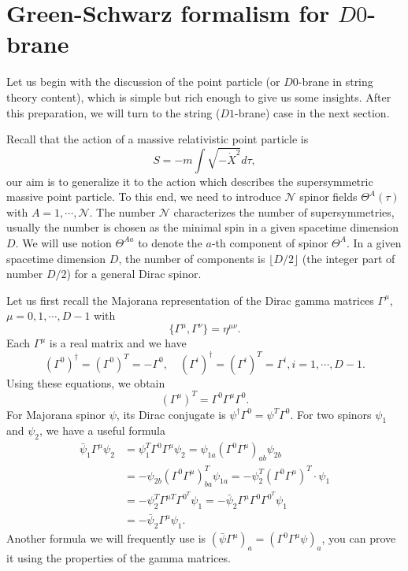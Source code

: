 \documentclass[graybox,envcountchap,sectrefs]{svmono}
\begin{document}
\section{Green-Schwarz formalism for $D0$-brane}
Let us begin with the discussion of the point particle (or $D0$-brane in string theory content), which is simple but rich enough to give us some insights.
After this preparation, we will turn to the string ($D1$-brane) case in the next section.

Recall that the action of a massive relativistic point particle is 
\begin{equation}
S=-m\int \sqrt{-\dot{X}^2}d\tau,\label{eq:pointaction}
\end{equation}
our aim is to generalize it to the action which describes the supersymmetric massive point particle.
To this end, we need to introduce $\mathcal{N}$ spinor fields $\Theta^A(\tau)$ with $A=1,\cdots,\mathcal{N}$. The number $\mathcal{N}$ characterizes the number of supersymmetries, usually the number is chosen as the minimal spin in a given spacetime dimension $D$.
We will use notion $\Theta^{Aa}$ to denote the $a$-th component of spinor $\Theta^A$. In a given spacetime dimension $D$, the number of components is $\lfloor D/2\rfloor$ (the integer part of number $D/2$) for a general Dirac spinor.

Let us first recall the Majorana representation of the Dirac gamma matrices $\Gamma^{\mu}$, $\mu=0,1,\cdots, D-1$ with
 \begin{equation}
 	\{\Gamma^{\mu},\Gamma^{\nu}\}=\eta^{\mu\nu}.
 \end{equation}
Each $\Gamma^{\mu}$ is a real matrix and we have
\begin{equation}
(\Gamma^{0})^{\dagger}=	(\Gamma^{0})^{T}=-\Gamma^0,\quad (\Gamma^{i})^{\dagger}=(\Gamma^{i})^{T}=\Gamma^i, i=1,\cdots,D-1.
\end{equation}
Using these equations, we obtain
\begin{equation}
(\Gamma^{\mu})^T=\Gamma^0\Gamma^{\mu}\Gamma^{0}.
\end{equation}
For Majorana spinor $\psi$, its Dirac conjugate is $\psi^{\dagger}\Gamma^0=\psi^{T}\Gamma^0$.
For two spinors $\psi_1$ and $\psi_2$, we have a useful formula
\begin{equation}
\begin{aligned}
\bar{\psi}_{1} \Gamma^{\mu} \psi_{2} &=\psi_{1}^{T} \Gamma^{0} \Gamma^{\mu} \psi_{2}=\psi_{1 a}\left(\Gamma^{0} \Gamma^{\mu}\right)_{a b} \psi_{2 b} \\
&=-{\psi_{2 b}}\left(\Gamma^{0} \Gamma^{\mu}\right)_{b a}^{T} \psi_{1 a}=-\psi_{2}^{T}\left(\Gamma^{0} \Gamma^{\mu}\right)^{T} \cdot \psi_{1} \\
&=-\psi_{2}^{T} \Gamma^{\mu T} \Gamma^{0^{T}} \psi_{1}=-\bar{\psi}_{2} \Gamma^{\mu} \Gamma^{0} \Gamma^{0^{T}} \psi_{1} \\
&=-\bar{\psi}_{2} \Gamma^{\mu} \psi_{1}.
\end{aligned}
\end{equation}
Another formula we will frequently use is $(\bar{\psi}\Gamma^{\mu})_a=(\Gamma^0\Gamma^{\mu}\psi)_a$, you can prove it using the properties of the gamma matrices.
\end{document}
